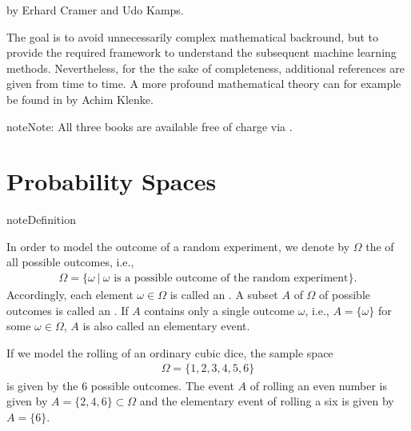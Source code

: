 \documentclass[letterpaper,10pt,english]{jupyterBook}
\begin{document}
\sphinxAtStartPar
by Erhard Cramer and Udo Kamps.

\sphinxAtStartPar
The goal is to avoid unnecessarily complex mathematical backround, but to provide the required framework to understand the subsequent machine learning methods. Nevertheless, for the the sake of completeness, additional references are given from time to time. A more profound mathematical theory can for example be found in  by Achim Klenke.

\begin{sphinxadmonition}{note}{Note:}
\sphinxAtStartPar
All three books are available free of charge via .
\end{sphinxadmonition}


\section{Probability Spaces}
\label{\detokenize{fund/fundprob:probability-spaces}}
\begin{sphinxadmonition}{note}{Definition}

\sphinxAtStartPar
In order to model the outcome of a random experiment, we denote by \(\Omega\) the  of all possible outcomes, i.e.,
\begin{equation*}
\begin{split}\Omega = \{ \omega ~|~ \omega \text{ is a possible outcome of the random experiment}\}.\end{split}
\end{equation*}
\sphinxAtStartPar
Accordingly, each element \(\omega \in \Omega\) is called an . A subset \(A\) of \(\Omega\) of possible outcomes is called an . If \(A\) contains only a single outcome \(\omega\), i.e., \(A=\{\omega\}\) for some \(\omega \in \Omega\), \(A\) is also called an elementary event.
\end{sphinxadmonition}

\sphinxAtStartPar
If we model the rolling of an ordinary cubic dice, the sample space
\begin{equation}\label{equation:fund/fundprob:ex:dice}
\begin{split}\Omega= \{1, 2, 3, 4, 5, 6\}\end{split}
\end{equation}
\sphinxAtStartPar
is given by the 6 possible outcomes. The event \(A\) of rolling an even number is given by \(A = \{2, 4, 6\} \subset \Omega\) and the elementary event of rolling a six is given by \(A=\{6\}\).
\end{document}

